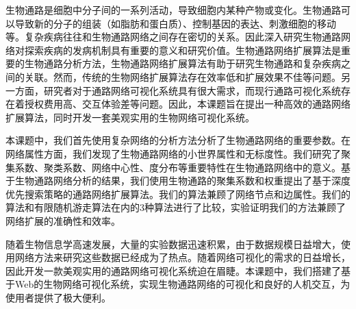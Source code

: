 \begin{cabstract}

生物通路是细胞中分子间的一系列活动，导致细胞内某种产物或变化。生物通路可以导致新的分子的组装（如脂肪和蛋白质）、控制基因的表达、刺激细胞的移动等。复杂疾病往往和生物通路网络之间存在密切的关系。因此深入研究生物通路网络对探索疾病的发病机制具有重要的意义和研究价值。生物通路网络扩展算法是重要的生物通路分析方法，生物通路网络扩展算法有助于研究生物通路和复杂疾病之间的关联。然而，传统的生物网络扩展算法存在效率低和扩展效果不佳等问题。另一方面，研究者对于通路网络可视化系统具有很大需求，而现行通路可视化系统存在着授权费用高、交互体验差等问题。因此，本课题旨在提出一种高效的通路网络扩展算法，同时开发一套美观实用的生物网络可视化系统。

本课题中，我们首先使用复杂网络的分析方法分析了生物通路网络的重要参数。在网络属性方面，我们发现了生物通路网络的小世界属性和无标度性。我们研究了聚集系数、聚类系数、网络中心性、度分布等重要特性在生物通路网络中的意义。基于生物通路网络分析的结果，我们使用生物通路的聚集系数和权重提出了基于深度优先搜索策略的通路网络扩展算法。我们的算法兼顾了网络节点和边属性。我们的算法和有限随机游走算法在内的3种算法进行了比较，实验证明我们的方法兼顾了网络扩展的准确性和效率。

随着生物信息学高速发展，大量的实验数据迅速积累，由于数据规模日益增大，使用网络方法来研究这些数据已经成为了热点。随着网络可视化的需求的日益增长，因此开发一款美观实用的通路网络可视化系统迫在眉睫。本课题中，我们搭建了基于Web的生物网络可视化系统，实现生物通路网络的可视化和良好的人机交互，为使用者提供了极大便利。

\end{cabstract}

